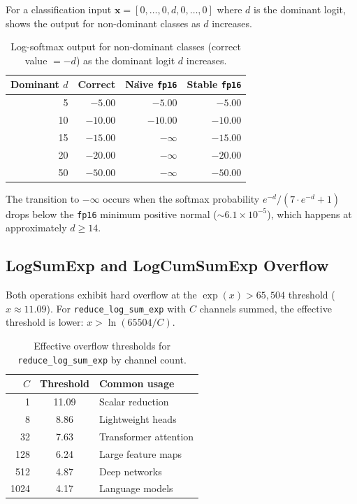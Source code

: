 \documentclass[10pt,twocolumn]{article}
\newcommand{\fp}{\texttt{fp16}}
\begin{document}
For a classification input $\mathbf{x} = [0, \ldots, 0, d, 0,
\ldots, 0]$ where $d$ is the dominant logit, 
shows the output for non-dominant classes as $d$ increases.

\begin{table}[h]
\centering
\caption{Log-softmax output for non-dominant classes (correct
  value $= -d$) as the dominant logit $d$ increases.}
\label{tab:logsoftmax}
\small
\begin{tabular}{@{}rrrr@{}}
\toprule
\textbf{Dominant $d$} & \textbf{Correct} &
  \textbf{Na\"{\i}ve \fp{}} & \textbf{Stable \fp{}} \\
\midrule
5   & $-5.00$   & $-5.00$   & $-5.00$ \\
10  & $-10.00$  & $-10.00$  & $-10.00$ \\
15  & $-15.00$  & $-\infty$ & $-15.00$ \\
20  & $-20.00$  & $-\infty$ & $-20.00$ \\
50  & $-50.00$  & $-\infty$ & $-50.00$ \\
\bottomrule
\end{tabular}
\end{table}

The transition to $-\infty$ occurs when the softmax probability
$e^{-d} / (7 \cdot e^{-d} + 1)$ drops below the \fp{} minimum
positive normal ($\sim 6.1 \times 10^{-5}$), which happens at
approximately $d \geq 14$.

\subsection{LogSumExp and LogCumSumExp Overflow}

Both operations exhibit hard overflow at the $\exp(x) > 65{,}504$
threshold ($x \approx 11.09$).  For \texttt{reduce\_log\_sum\_exp}
with $C$ channels summed, the effective threshold is lower:
$x > \ln(65504/C)$.

\begin{table}[h]
\centering
\caption{Effective overflow thresholds for
  \texttt{reduce\_log\_sum\_exp} by channel count.}
\label{tab:lse_thresholds}
\small
\begin{tabular}{@{}rcl@{}}
\toprule
\textbf{$C$} & \textbf{Threshold} &
  \textbf{Common usage} \\
\midrule
1    & 11.09 & Scalar reduction \\
8    & 8.86  & Lightweight heads \\
32   & 7.63  & Transformer attention \\
128  & 6.24  & Large feature maps \\
512  & 4.87  & Deep networks \\
1024 & 4.17  & Language models \\
\bottomrule
\end{tabular}
\end{table}
\end{document}
